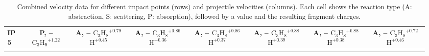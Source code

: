 \begin{table}[t]
\begin{tabular}{lccccccc}
\midrule
\textbf{IP 5} & \makecell{P, -- \\ $\mathrm{C_3H_9}^{+1.22}$} & \makecell{A, -- \\ $\mathrm{C_3H_8}^{+0.79}$ \\ $\mathrm{H}^{+0.45}$} & \makecell{A, -- \\ $\mathrm{C_3H_8}^{+0.86}$ \\ $\mathrm{H}^{+0.36}$} & \makecell{A, -- \\ $\mathrm{C_3H_8}^{+0.86}$ \\ $\mathrm{H}^{+0.37}$} & \makecell{A, -- \\ $\mathrm{C_3H_8}^{+0.88}$ \\ $\mathrm{H}^{+0.39}$} & \makecell{A, -- \\ $\mathrm{C_3H_8}^{+0.88}$ \\ $\mathrm{H}^{+0.38}$} & \makecell{A, -- \\ $\mathrm{C_3H_8}^{+0.72}$ \\ $\mathrm{H}^{+0.46}$} \\
\midrule
\arrayrulecolor{black}
\bottomrule
\end{tabular}
\caption{Combined velocity data for different impact points (rows) and projectile velocities (columns). Each cell shows the reaction type (A: abstraction, S: scattering, P: absorption), followed by a value and the resulting fragment charges.}
\label{tab:combined_velocity_data}
\end{table}


